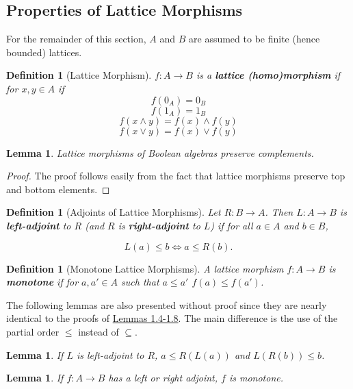 \documentclass{article}
\newtheorem{lemma}[proposition]{Lemma}
\newtheorem{definition}[proposition]{Definition}
\numberwithin{equation}{section}
\newcommand{\meet}{\wedge}
\newcommand{\join}{\vee}
\begin{document}
\subsection{Properties of Lattice Morphisms}

For the remainder of this section, $A$ and $B$ are assumed to be finite (hence bounded) lattices. 

\begin{definition}[Lattice Morphism]
$f : A \to B$ is a \textbf{lattice (homo)morphism} if for $x, y \in A$ if $$f(0_A) = 0_B$$ $$f(1_A) = 1_B$$ $$f(x \meet y) = f(x) \meet f(y)$$ $$f(x \join y) = f(x) \join f(y)$$ 
\end{definition}

\begin{lemma}
Lattice morphisms of Boolean algebras preserve complements.
\end{lemma}

\begin{proof}
The proof follows easily from the fact that lattice morphisms preserve top and bottom elements.
\end{proof}

\begin{definition}[Adjoints of Lattice Morphisms]
Let $R : B \to A$. Then $L : A \to B$ is \textbf{left-adjoint} to $R$ (and $R$ is \textbf{right-adjoint} to $L$) if for all $a \in A$ and $b \in B$,

\begin{equation*}
L(a) \leq b \Longleftrightarrow a \leq R(b).
\end{equation*}
\end{definition}

\begin{definition}[Monotone Lattice Morphisms]
A lattice morphism $f : A \to B$ is \textbf{monotone} if for $a, a' \in A$ such that $a \leq a'$ $f(a) \leq f(a')$.
\end{definition}

The following lemmas are also presented without proof since they are nearly identical to the proofs of \hyperref[lem:inv-img-adjoint-lem-1]{Lemmas 1.4-1.8}. The main difference is the use of the partial order $\leq$ instead of $\subseteq$.

\begin{lemma}
If $L$ is left-adjoint to $R$, $a \leq R(L(a))$ and $L(R(b)) \leq b$.
\end{lemma}

\begin{lemma}
If $f : A \to B$ has a left or right adjoint, $f$ is monotone.
\end{lemma}
\end{document}

